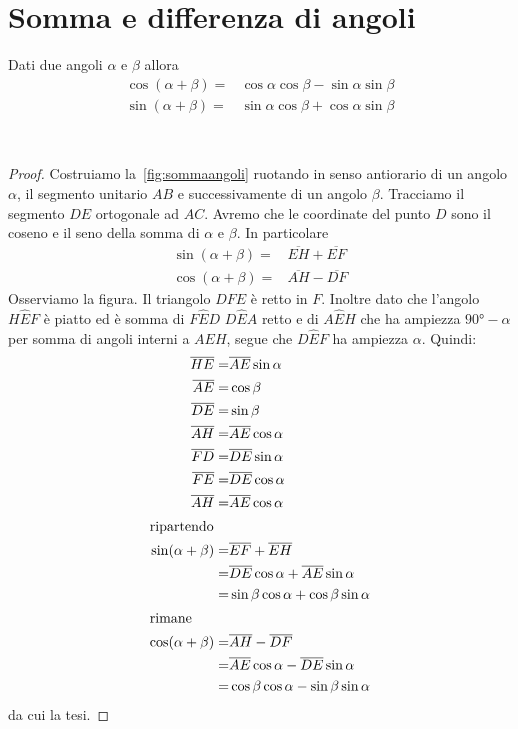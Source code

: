 \section{Somma e differenza di angoli}
\begin{thm}\label{thm:Cosenosenosomma}
	Dati due angoli $\alpha$ e $\beta$ allora
	\begin{align*}
	\cos(\alpha+\beta)=&\cos\alpha\cos\beta-\sin\alpha\sin\beta \\
	\sin(\alpha+\beta)=&\sin\alpha\cos\beta+\cos\alpha\sin\beta 
	\end{align*}
\end{thm}~\cite{Brett2020}
\begin{proof}
	Costruiamo la~\vref{fig:sommaangoli} ruotando in senso antiorario di un angolo$\alpha$, il segmento unitario $AB$ e successivamente di un angolo $\beta$. Tracciamo il segmento $DE$ ortogonale ad $AC$. Avremo che le coordinate del punto $D$ sono il coseno e il seno  della somma  di $\alpha$ e $\beta$.  In particolare 
	\begin{align*}
	\sin(\alpha+\beta)=&\overline{EH}+\overline{EF}\\
	\cos(\alpha+\beta)=&\overline{AH}-\overline{DF}
	\end{align*}
	Osserviamo la figura. Il triangolo $DFE$ è retto in $F$. Inoltre dato che l'angolo $H\hat{E}F$ è piatto ed è somma di $F\hat{E}D$ $D\hat{E}A$ retto e di $A\hat{E}H$ che ha ampiezza  $\ang{90;;}-\alpha$ per somma di angoli interni a $AEH$, segue che $D\hat{E}F$ ha ampiezza $\alpha$. Quindi:
	\begin{align*}
	\overline{HE}=&\overline{AE}\sin\alpha\\
	\overline{AE}=&\cos\beta\\
	\overline{DE}=&\sin\beta\\
	\overline{AH}=&\overline{AE}\cos\alpha\\
	\overline{FD}=&\overline{DE}\sin\alpha\\
	\overline{FE}=&\overline{DE}\cos\alpha\\
	\overline{AH}=&\overline{AE}\cos\alpha\\
	\intertext{ripartendo}
	\sin(\alpha+\beta)=&\overline{EF}+\overline{EH}\\
	=&\overline{DE}\cos\alpha+\overline{AE}\sin\alpha\\
	=&\sin\beta\cos\alpha+\cos\beta\sin\alpha\\
	\intertext{rimane}
	\cos(\alpha+\beta)=&\overline{AH}-\overline{DF}\\
	=&\overline{AE}\cos\alpha-\overline{DE}\sin\alpha\\
	=&\cos\beta\cos\alpha-\sin\beta\sin\alpha\\
	\end{align*}
	da cui la tesi.
\end{proof}
